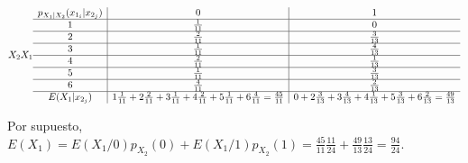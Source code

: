 \documentclass[11pt]{article}
\begin{document}
\[
X_2 \\X_1 \begin{array}{c|c|c}
p_{X_1 | X_2}(x_{1_i} | x_{2_j}) & 0 & 1\\
\hline
1 & \frac{1}{11} & 0\\
\hline
2 & \frac{2}{11} & \frac{3}{13}\\
\hline
3 & \frac{1}{11} & \frac{4}{13}\\
\hline
4 & \frac{2}{11} & \frac{1}{13}\\
\hline
5 & \frac{1}{11} & \frac{3}{13}\\
\hline
6 & \frac{4}{11} & \frac{2}{13}\\
\hline
E(X_1 | x_{2_j}) & 
1\frac{1}{11}+2\frac{2}{11}+3\frac{1}{11}+4\frac{2}{11}+5\frac{1}{11}+6\frac{4}{11}=\frac{45}{11}
& 0+2\frac{3}{13}+3\frac{4}{13}+4\frac{1}{13}+5\frac{3}{13}+6\frac{2}{13}=\frac{49}{13}
\end{array}
\]

Por supuesto,
\(E(X_1)=E(X_1/0)p_{X_2}(0)+E(X_1/1)p_{X_2}(1) = \frac{45}{11}\frac{11}{24}+\frac{49}{13}\frac{13}{24}=\frac{94}{24}\).


    
    

    
    
\end{document}
